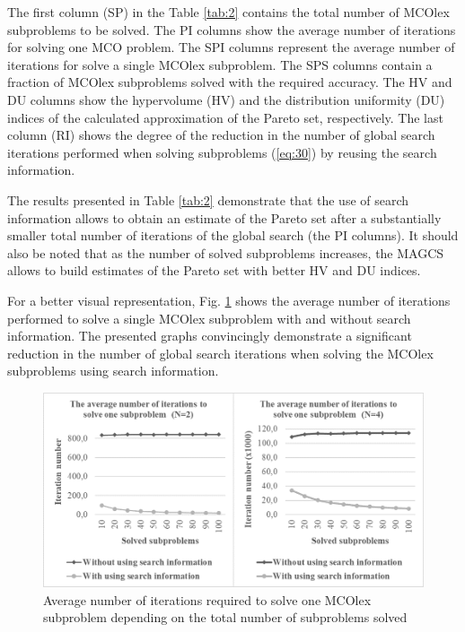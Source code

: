 \documentclass[smallextended]{svjour3}       %
\begin{document}
The first column (SP) in the Table \ref{tab:2} contains the total number of MCOlex subproblems to be solved. The PI columns show the average number of iterations for solving one MCO problem. The SPI columns represent the average number of iterations for solve a single MCOlex subproblem. The SPS columns contain a fraction of MCOlex subproblems solved with the required accuracy. The HV and DU columns show the hypervolume (HV) and the distribution uniformity (DU) indices of the calculated approximation of the Pareto set, respectively. The last column (RI) shows the degree of the reduction in the number of global search iterations performed when solving subproblems (\ref{eq:30}) by reusing the search information.

The results presented in Table \ref{tab:2} demonstrate that the use of search information allows to obtain an estimate of the Pareto set after a substantially smaller total number of iterations of the global search (the PI columns). It should also be noted that as the number of solved subproblems increases, the MAGCS allows to build estimates of the Pareto set with better HV and DU indices.

For a better visual representation, Fig. \ref{fig:4} shows the average number of iterations performed to solve a single MCOlex subproblem with and without search information. The presented graphs convincingly demonstrate a significant reduction in the number of global search iterations when solving the MCOlex subproblems using search information.

\begin{figure}
  \centering
  \includegraphics[width=1\linewidth]{fig4}
  \caption{Average number of iterations required to solve one MCOlex subproblem depending on the total number of subproblems solved}
  \label{fig:4}
\end{figure}
\end{document}
